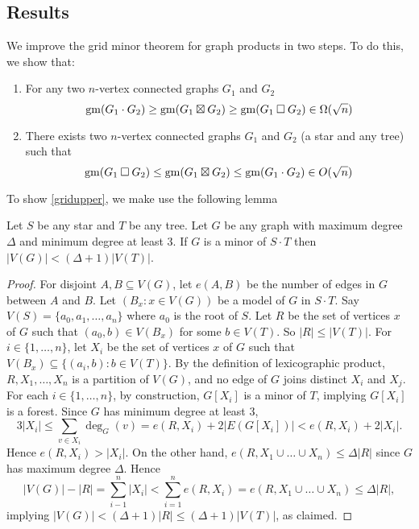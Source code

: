 \documentclass[../main.tex]{subfiles}
\begin{document}
	\subsection{Results}
	We improve the grid minor theorem for graph products in two steps. To do this, we show that:
	\begin{enumerate}
		\item  For any two $n$-vertex connected graphs $G_1$ and $G_2$
		\begin{equation} \label{gridlower}
			\operatorname{gm}(G_1\cdot G_2) \geq \operatorname{gm}(G_1\boxtimes G_2) \geq \operatorname{gm}(G_1\mathbin{\Box} G_2) \in \Omega(\sqrt{n})
		\end{equation} 
		
		\item There exists two $n$-vertex connected graphs $G_1$ and $G_2$ (a star and any tree) such that   
		\begin{equation} \label{gridupper}
			\operatorname{gm}(G_1\mathbin{\Box} G_2) \leq \operatorname{gm}(G_1\boxtimes G_2) \leq \operatorname{gm}(G_1\cdot G_2) \in O(\sqrt{n}) 
		\end{equation} 
	\end{enumerate}
	
	To show \cref{gridupper}, we make use the following lemma
	
	\begin{lem}
		\label{StarTree}
		Let $S$ be any star and $T$ be any tree. Let $G$ be any graph  with maximum degree $\Delta$ and minimum degree at least 3. If $G$ is a minor of $S \cdot T$ then $|V(G)|< (\Delta+1) |V(T)|$. 
	\end{lem}
	
	\begin{proof}
		For disjoint $A,B\subseteq V(G)$, let $e(A,B)$ be the number of edges in $G$ between $A$ and $B$. Let
		$(B_x:x\in V(G))$ be a model of $G$ in $S \cdot T$. Say $V(S)=\{a_0,a_1,\dots,a_n\}$ where $a_0$ is the root of $S$. Let $R$ be the set of vertices $x$ of $G$ such that $(a_0,b)\in V(B_x)$ for some $b\in V(T)$. So $|R|\leq |V(T)|$. For $i\in\{1,\dots,n\}$, let $X_i$ be the set of vertices $x$ of $G$ such that $V(B_x)\subseteq \{(a_i,b): b\in V(T)\}$. By the definition of lexicographic product,  $R,X_1,\dots,X_n$ is a partition of $V(G)$, and no edge of $G$ joins distinct $X_i$ and $X_j$. For each $i\in\{1,\dots,n\}$, by construction, $G[X_i]$ is a minor of $T$, implying $G[X_i]$ is a forest. Since $G$ has minimum degree at least 3, 
		$$3|X_i| \leq \sum_{v\in X_i}\deg_G(v) = e(R,X_i)+2|E(G[X_i])| < e(R,X_i) + 2|X_i|.$$
		Hence $e(R,X_i)> |X_i|$. On the other hand,  $e(R,X_1\cup\dots\cup X_n) \leq \Delta|R|$ since $G$ has maximum degree $\Delta$. Hence 
		$$|V(G)|-|R| = \sum_{i-1}^n|X_i| < \sum_{i=1}^n e(R,X_i) = e(R,X_1\cup\dots\cup X_n) \leq \Delta|R| ,$$
		implying $|V(G)|< (\Delta+1)|R| \leq (\Delta+1) |V(T)|$, as claimed. 
	\end{proof}
	
\end{document}

